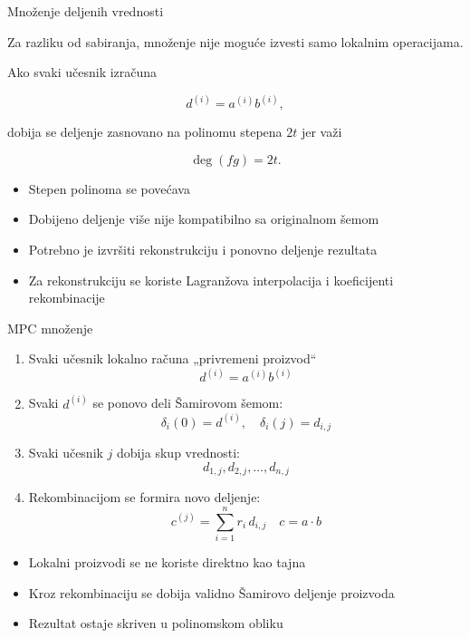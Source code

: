 \documentclass[aspectratio=1610]{beamer}
\begin{document}
\begin{frame}{Množenje deljenih vrednosti}

Za razliku od sabiranja, množenje nije moguće izvesti samo lokalnim operacijama.

Ako svaki učesnik izračuna

\[
d^{(i)}=a^{(i)}b^{(i)},
\]

dobija se deljenje zasnovano na polinomu stepena $2t$ jer važi

\[
\deg(fg)=2t.
\]

\begin{itemize}
    \item Stepen polinoma se povećava
    \item Dobijeno deljenje više nije kompatibilno sa originalnom šemom
    \item Potrebno je izvršiti rekonstrukciju i ponovno deljenje rezultata
    \item Za rekonstrukciju se koriste Lagranžova interpolacija i koeficijenti rekombinacije
\end{itemize}

\end{frame}

\begin{frame}{MPC množenje}

\begin{enumerate}
    \item Svaki učesnik lokalno računa „privremeni proizvod“
    \[
    d^{(i)} = a^{(i)} b^{(i)}
    \]

    \item Svaki $d^{(i)}$ se ponovo deli Šamirovom šemom:
    \[
    \delta_i(0)=d^{(i)}, \quad \delta_i(j)=d_{i,j}
    \]

    \item Svaki učesnik $j$ dobija skup vrednosti:
    \[
    d_{1,j}, d_{2,j}, \ldots, d_{n,j}
    \]

    \item Rekombinacijom se formira novo deljenje:
    \[
    c^{(j)} = \sum_{i=1}^{n} r_i \, d_{i,j} \quad c = a \cdot b
    \]
\end{enumerate}

\begin{itemize}
    \item Lokalni proizvodi se ne koriste direktno kao tajna
    \item Kroz rekombinaciju se dobija validno Šamirovo deljenje proizvoda
    \item Rezultat ostaje skriven u polinomskom obliku
\end{itemize}

\end{frame}
\end{document}

